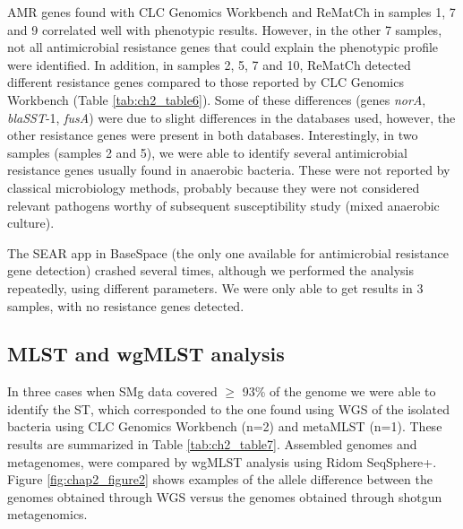 AMR genes found with CLC Genomics Workbench and ReMatCh in samples 1, 7 and 9 correlated well with phenotypic results. 
However, in the other 7 samples, not all antimicrobial resistance genes that could explain the phenotypic profile were identified. 
In addition, in samples 2, 5, 7 and 10, ReMatCh detected different resistance genes compared to those reported by CLC Genomics Workbench (Table \ref{tab:ch2_table6}).
Some of these differences (genes \textit{norA}, \textit{blaSST}-1, \textit{fusA}) were due to slight differences in the databases used, however, the other resistance genes were present in both databases. 
Interestingly, in two samples (samples 2 and 5), we were able to identify several antimicrobial resistance genes usually found in anaerobic bacteria. 
These were not reported by classical microbiology methods, probably because they were not considered relevant pathogens worthy of subsequent susceptibility study (mixed anaerobic culture).

\begin{landscape}

\end{landscape}

\begin{landscape}

\end{landscape}

The SEAR app in BaseSpace (the only one available for antimicrobial resistance gene detection) crashed several times, although we performed the analysis repeatedly, using different parameters.
We were only able to get results in 3 samples, with no resistance genes detected.


\subsection{MLST and wgMLST analysis}
 
In three cases when \ac{SMg} data covered $\geq$ 93\% of the genome we were able to identify the ST, which corresponded to the one found using \ac{WGS} of the isolated bacteria using CLC Genomics Workbench (n=2) and metaMLST (n=1). 
These results are summarized in Table \ref{tab:ch2_table7}.
Assembled genomes and metagenomes, were compared by wgMLST analysis using Ridom SeqSphere+. 
Figure \ref{fig:chap2_figure2} shows examples of the allele difference between the genomes obtained through \ac{WGS} versus the genomes obtained through shotgun metagenomics.

